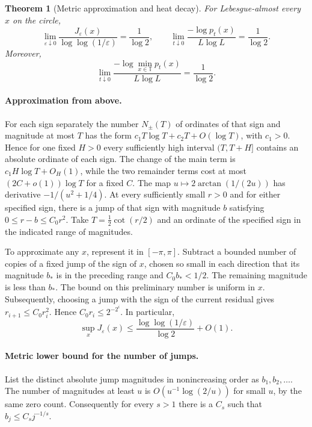 \documentclass[11pt]{article}
\newtheorem{theorem}{Theorem}[section]
\theoremstyle{remark}\newtheorem{remark}[theorem]{Remark}
\begin{document}
\begin{theorem}[Metric approximation and heat decay]\label{thm:metricdecay}
For Lebesgue-almost every $x$ on the circle,
\[
 \lim_{\varepsilon\downarrow0}
 \frac{J_{\varepsilon}(x)}{\log\log(1/\varepsilon)}
   =\frac1{\log 2},\qquad
 \lim_{t\downarrow0}\frac{-\log p_t(x)}{L\log L}
   =\frac1{\log 2}.
\]
Moreover,
\[
  \lim_{t\downarrow0}\frac{-\log\min_{x\in\mathbb T}p_t(x)}
                                  {L\log L}=\frac1{\log 2}.
\]
\end{theorem}

\paragraph{Approximation from above.}
For each sign separately the number $N_\pm(T)$ of ordinates of that sign
and magnitude at most $T$ has the form $c_1T\log T+c_2T+O(\log T)$,
with $c_1>0$. Hence for one fixed $H>0$ every sufficiently high interval
$(T,T+H]$ contains an absolute ordinate of each sign. The change of the main
term is $c_1H\log T+O_H(1)$, while the two remainder terms cost at most
$(2C+o(1))\log T$ for a fixed $C$. The map
$u\mapsto 2\arctan(1/(2u))$ has derivative $-1/(u^2+1/4)$.
At every sufficiently small $r>0$ and for either specified sign, there is
a jump of that sign with magnitude $b$ satisfying
$0\le r-b\le C_0 r^2$. Take $T=\tfrac12\cot(r/2)$ and an ordinate of the
specified sign in the indicated range of magnitudes.

To approximate any $x$, represent it in $[-\pi,\pi]$. Subtract a bounded
number of copies of a fixed jump of the sign of $x$, chosen so small in
each direction that its magnitude $b_*$ is in the preceding range and
$C_0b_*<1/2$. The remaining magnitude is less than $b_*$.
The bound on this preliminary number is uniform in $x$. Subsequently,
choosing a jump with the sign of the current residual gives
$r_{i+1}\le C_0 r_i^2$. Hence $C_0r_i\le2^{-2^i}$. In particular,
\begin{equation}\label{eq:metricgreedy}
 \sup_x J_{\varepsilon}(x)\le
       \frac{\log\log(1/\varepsilon)}{\log2}+O(1).
\end{equation}

\paragraph{Metric lower bound for the number of jumps.}
List the distinct absolute jump magnitudes in nonincreasing order as
$b_1,b_2,\ldots$. The number of magnitudes at least $u$ is
$O(u^{-1}\log(2/u))$ for small $u$, by the same zero count.
Consequently for every $s>1$ there is a $C_s$ such that $b_j\le C_sj^{-1/s}$.
\end{document}
